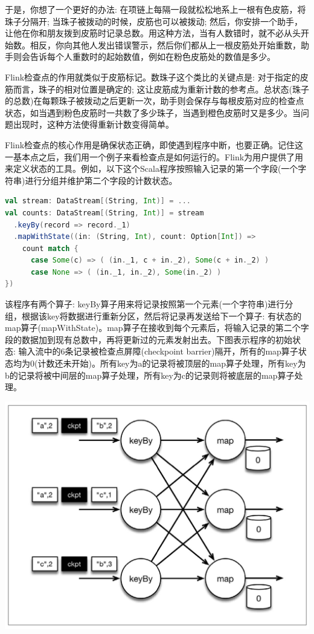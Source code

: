 \documentclass[oneside]{ctexbook}
\begin{document}
于是，你想了一个更好的办法: 在项链上每隔一段就松松地系上一根有色皮筋，将珠子分隔开; 当珠子被拨动的时候，皮筋也可以被拨动; 然后，你安排一个助手，让他在你和朋友拨到皮筋时记录总数。用这种方法，当有人数错时，就不必从头开始数。相反，你向其他人发出错误警示，然后你们都从上一根皮筋处开始重数，助手则会告诉每个人重数时的起始数值，例如在粉色皮筋处的数值是多少。

Flink检查点的作用就类似于皮筋标记。数珠子这个类比的关键点是: 对于指定的皮筋而言，珠子的相对位置是确定的; 这让皮筋成为重新计数的参考点。总状态(珠子的总数)在每颗珠子被拨动之后更新一次，助手则会保存与每根皮筋对应的检查点状态，如当遇到粉色皮筋时一共数了多少珠子，当遇到橙色皮筋时又是多少。当问题出现时，这种方法使得重新计数变得简单。

Flink检查点的核心作用是确保状态正确，即使遇到程序中断，也要正确。记住这一基本点之后，我们用一个例子来看检查点是如何运行的。Flink为用户提供了用来定义状态的工具。例如，以下这个Scala程序按照输入记录的第一个字段(一个字符串)进行分组并维护第二个字段的计数状态。

\begin{lstlisting}[language=scala]
val stream: DataStream[(String, Int)] = ...
val counts: DataStream[(String, Int)] = stream
  .keyBy(record => record._1)
  .mapWithState((in: (String, Int), count: Option[Int]) =>
    count match {
      case Some(c) => ( (in._1, c + in._2), Some(c + in._2) )
      case None => ( (in._1, in._2), Some(in._2) )
})
\end{lstlisting}

该程序有两个算子: keyBy算子用来将记录按照第一个元素(一个字符串)进行分组，根据该key将数据进行重新分区，然后将记录再发送给下一个算子: 有状态的map算子(mapWithState)。map算子在接收到每个元素后，将输入记录的第二个字段的数据加到现有总数中，再将更新过的元素发射出去。下图表示程序的初始状态: 输入流中的6条记录被检查点屏障(checkpoint barrier)隔开，所有的map算子状态均为0(计数还未开始)。所有key为a的记录将被顶层的map算子处理，所有key为b的记录将被中间层的map算子处理，所有key为c的记录则将被底层的map算子处理。

\noindent \includegraphics[width=\textwidth]{ckpt1.png}
\end{document}
